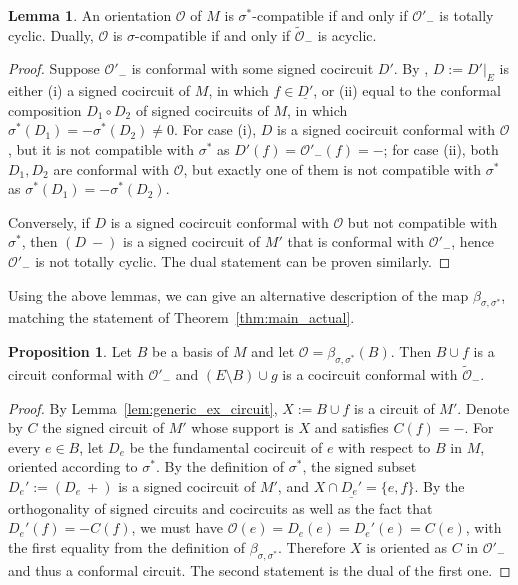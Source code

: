 \documentclass[12pt]{amsart}
\numberwithin{equation}{section}
\theoremstyle{definition}
\newtheorem{lemma}[theorem]{Lemma}
\newtheorem{proposition}[theorem]{Proposition}
\newcommand{\Ocal}{{\mathcal O}}
\begin{document}
\begin{lemma} \label{lem:general_CCMO}
An orientation $\Ocal$ of $M$ is $\sigma^*$-compatible if and only if $\Ocal'_-$ is totally cyclic. Dually, $\Ocal$ is $\sigma$-compatible if and only if $\widetilde{\Ocal}_-$ is acyclic.
\end{lemma}

\begin{proof}
Suppose $\Ocal'_-$ is conformal with some signed cocircuit $D'$. By \cite[Proposition 7.1.4 (ii)]{BLSWZ_book}, $D:=D'|_E$ is either (i) a signed cocircuit of $M$, in which $f\in\underline{D'}$, or (ii) equal to the conformal composition $D_1\circ D_2$ of signed cocircuits of $M$, in which $\sigma^*(D_1)=-\sigma^*(D_2)\neq 0$. For case (i), $D$ is a signed cocircuit conformal with $\Ocal$, but it is not compatible with $\sigma^*$ as $D'(f)=\Ocal'_-(f)=-$; for case (ii), both $D_1,D_2$ are conformal with $\Ocal$, but exactly one of them is not compatible with $\sigma^*$ as $\sigma^*(D_1)=-\sigma^*(D_2)$.

Conversely, if $D$ is a signed cocircuit conformal with $\Ocal$ but not compatible with $\sigma^*$, then $(D\ -)$ is a signed cocircuit of $M'$ that is conformal with $\Ocal'_-$, hence $\Ocal'_-$ is not totally cyclic. The dual statement can be proven similarly.
\end{proof}

Using the above lemmas, we can give an alternative description of the map $\beta_{\sigma,\sigma^*}$, matching the statement of Theorem~\ref{thm:main_actual}.

\begin{proposition} \label{prop:beta_EL_pos}
Let $B$ be a basis of $M$ and let $\Ocal=\beta_{\sigma,\sigma^*}(B)$. Then $B\cup f$ is a circuit conformal with $\Ocal'_-$ and $(E\setminus B)\cup g$ is a cocircuit conformal with $\widetilde{\Ocal}_-$.
\end{proposition}

\begin{proof}
By Lemma~\ref{lem:generic_ex_circuit}, $X:=B\cup f$ is a circuit of $M'$. Denote by $C$ the signed circuit of $M'$ whose support is $X$ and satisfies $C(f)=-$. For every $e\in B$, let $D_e$ be the fundamental cocircuit of $e$ with respect to $B$ in $M$, oriented according to $\sigma^*$. By the definition of $\sigma^*$, the signed subset $D_e':=(D_e\ +)$ is a signed cocircuit of $M'$, and $X\cap \underline{D_e'}=\{e,f\}$. By the orthogonality of signed circuits and cocircuits as well as the fact that $D_e'(f)=-C(f)$, we must have $\Ocal(e)=D_e(e)=D_e'(e)=C(e)$, with the first equality from the definition of $\beta_{\sigma,\sigma^*}$. Therefore $X$ is oriented as $C$ in $\Ocal'_-$ and thus a conformal circuit. The second statement is the dual of the first one.
\end{proof}
\end{document}
